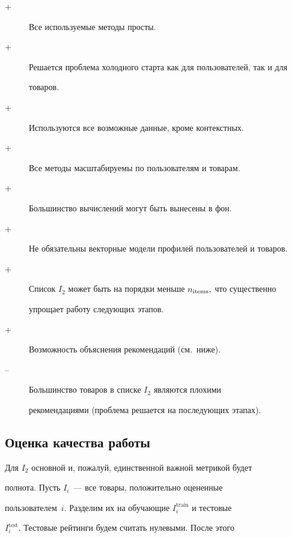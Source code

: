 \begin{description} %


\item[+] Все используемые методы просты. 


\item[+] Решается проблема холодного старта как для пользователей, так и для


товаров. 


\item[+] Используются все возможные данные, кроме контекстных. 


\item[+] Все методы масштабируемы по пользователям и товарам. 


\item[+] Большинство вычислений могут быть вынесены в фон. 


\item[+] Не обязательны векторные модели профилей пользователей и товаров. 


\item[+] Список $I_2$ может быть на порядки меньше $n_{\mathrm{items}},$ что существенно 


упрощает работу следующих этапов. 


\item[+] Возможность объяснения рекомендаций (см.\ ниже).


\item[--] Большинство товаров в списке $I_2$ являются плохими


рекомендациями (проблема решается на последующих этапах).


\end{description}





\subsection{Оценка качества работы}





Для $I_2$ основной и, пожалуй, единственной важной метрикой будет


полнота. Пусть $I_i$~--- все товары, положительно оцененные


пользователем~$i.$ Разделим их на обучающие $I_i^{\mathrm{train}}$ и тестовые


$I_i^{\mathrm{test}}$. Тестовые рейтинги будем считать нулевыми. После этого


